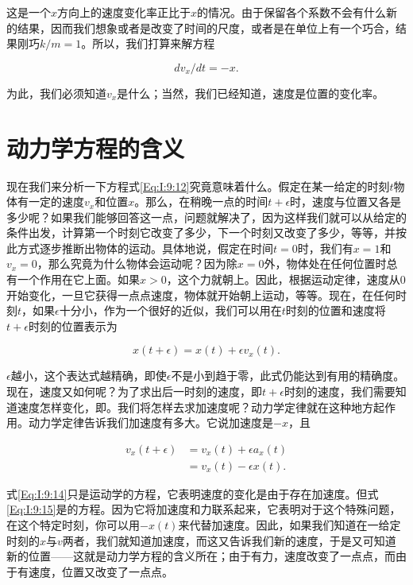 \documentclass[12pt,oneside]{book}
\begin{document}
这是一个$ x $方向上的速度变化率正比于$ x $的情况。由于保留各个系数不会有什么新的结果，因而我们想象或者是改变了时间的尺度，或者是在单位上有一个巧合，结果刚巧$ k/m=1 $。所以，我们打算来解方程

\begin{equation}
\label{Eq:I:9:12}
dv_x/dt=-x.
\end{equation}

为此，我们必须知道$ v_x $是什么；当然，我们已经知道，速度是位置的变化率。

\section{动力学方程的含义}
现在我们来分析一下方程式\eqref{Eq:I:9:12}究竟意味着什么。假定在某一给定的时刻$ t $物体有一定的速度$ v_x $和位置$ x $。那么，在稍晚一点的时间$ t+\epsilon $时，速度与位置又各是多少呢？如果我们能够回答这一点，问题就解决了，因为这样我们就可以从给定的条件出发，计算第一个时刻它改变了多少，下一个时刻又改变了多少，等等，并按此方式逐步推断出物体的运动。具体地说，假定在时间$ t=0 $时，我们有$ x=1 $和$ v_x = 0 $，那么究竟为什么物体会运动呢？因为除$ x=0 $外，物体处在任何位置时总有一个作用在它上面。如果$ x>0 $，这个力就朝上。因此，根据运动定律，速度从0开始变化，一旦它获得一点点速度，物体就开始朝上运动，等等。现在，在任何时刻$ t $，如果$ \epsilon $十分小，作为一个很好的近似，我们可以用在$ t $时刻的位置和速度将$ t+\epsilon $时刻的位置表示为

\begin{equation}
\label{Eq:I:9:13}
x(t+\epsilon)=x(t)+\epsilon v_x(t).
\end{equation}

$ \epsilon $越小，这个表达式越精确，即使$ \epsilon $不是小到趋于零，此式仍能达到有用的精确度。现在，速度又如何呢？为了求出后一时刻的速度，即$   t+\epsilon $时刻的速度，我们需要知道速度怎样变化，即。我们将怎样去求加速度呢？动力学定律就在这种地方起作用。动力学定律告诉我们加速度有多大。它说加速度是$ -x $，且

\begin{align}
\label{Eq:I:9:14}
v_x(t+\epsilon)&=v_x(t)+\epsilon a_x(t)\\[1ex]
\label{Eq:I:9:15}
&=v_x(t)-\epsilon x(t).
\end{align}

式\eqref{Eq:I:9:14}只是运动学的方程，它表明速度的变化是由于存在加速度。但式\eqref{Eq:I:9:15}是的方程。因为它将加速度和力联系起来，它表明对于这个特殊问题，在这个特定时刻，你可以用$ -x(t) $来代替加速度。因此，如果我们知道在一给定时刻的$ x $与$ v $两者，我们就知道加速度，而这又告诉我们新的速度，于是又可知道新的位置——这就是动力学方程的含义所在；由于有力，速度改变了一点点，而由于有速度，位置又改变了一点点。
\end{document}
